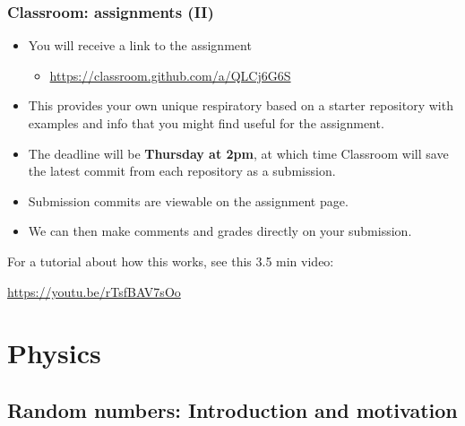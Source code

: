 \documentclass[hyperref={colorlinks=true}]{beamer}
\begin{document}
\begin{frame}%
  \frametitle{\github Classroom: assignments (II)}
  
  \begin{itemize}
    \item You will receive a link to the assignment
    \begin{itemize}
      \item \url{https://classroom.github.com/a/QLCj6G6S}
    \end{itemize}
    \item This provides your own unique respiratory based on a starter repository with examples and info that you might find useful for the assignment. 
    \item The deadline will be \textbf{Thursday at 2pm}, at which time \github Classroom will save the latest commit from each repository as a submission. 
    \item Submission commits are viewable  on the assignment page. 
    \item We can then make comments and grades directly on your submission.
  \end{itemize}
  
  For a tutorial about how this works, see this 3.5 min video:

  \centering \url{https://youtu.be/rTsfBAV7sOo}

\end{frame}

\section[Physics]{Physics}

\subsection[Random numbers: Introduction and motivation]{Random numbers: Introduction and motivation}
\end{document}

